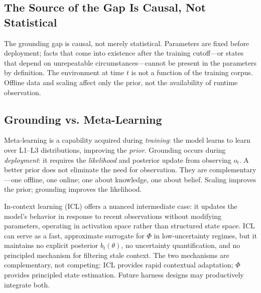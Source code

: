 \subsection{The Source of the Gap Is Causal, Not Statistical}

The grounding gap is causal, not merely statistical. Parameters are fixed before deployment; facts that come into existence after the training cutoff---or states that depend on unrepeatable circumstances---cannot be present in the parameters by definition. The environment at time \(t\) is not a function of the training corpus. Offline data and scaling affect only the prior, not the availability of runtime observation.

\subsection{Grounding vs. Meta-Learning}

Meta-learning is a capability acquired during \emph{training}: the model learns to learn over L1--L3 distributions, improving the \emph{prior}. Grounding occurs during \emph{deployment}: it requires the \emph{likelihood} and posterior update from observing \(o_t\). A better prior does not eliminate the need for observation. They are complementary---one offline, one online; one about knowledge, one about belief. Scaling improves the prior; grounding improves the likelihood.

In-context learning (ICL) offers a nuanced intermediate case: it updates the model's behavior in response to recent observations without modifying parameters, operating in activation space rather than structured state space. ICL can serve as a fast, approximate surrogate for \(\Phi\) in low-uncertainty regimes, but it maintains no explicit posterior \(b_t(\theta)\), no uncertainty quantification, and no principled mechanism for filtering stale context. The two mechanisms are complementary, not competing: ICL provides rapid contextual adaptation; \(\Phi\) provides principled state estimation. Future harness designs may productively integrate both.
